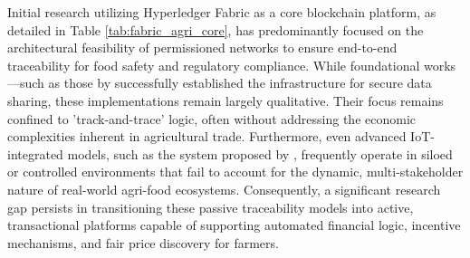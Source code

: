 \documentclass[12pt]{article}
\begin{document}
	Initial research utilizing Hyperledger Fabric as a core blockchain platform, as detailed in Table \ref{tab:fabric_agri_core}, has predominantly focused on the architectural feasibility of permissioned networks to ensure end-to-end traceability for food safety and regulatory compliance. While foundational works—such as those by \cite{marchese_blockchain-based_2022} successfully established the infrastructure for secure data sharing, these implementations remain largely qualitative. Their focus remains confined to 'track-and-trace' logic, often without addressing the economic complexities inherent in agricultural trade. Furthermore, even advanced IoT-integrated models, such as the system proposed by \cite{zhang_information_2022}, frequently operate in siloed or controlled environments that fail to account for the dynamic, multi-stakeholder nature of real-world agri-food ecosystems. Consequently, a significant research gap persists in transitioning these passive traceability models into active, transactional platforms capable of supporting automated financial logic, incentive mechanisms, and fair price discovery for farmers.
	
\end{document}
